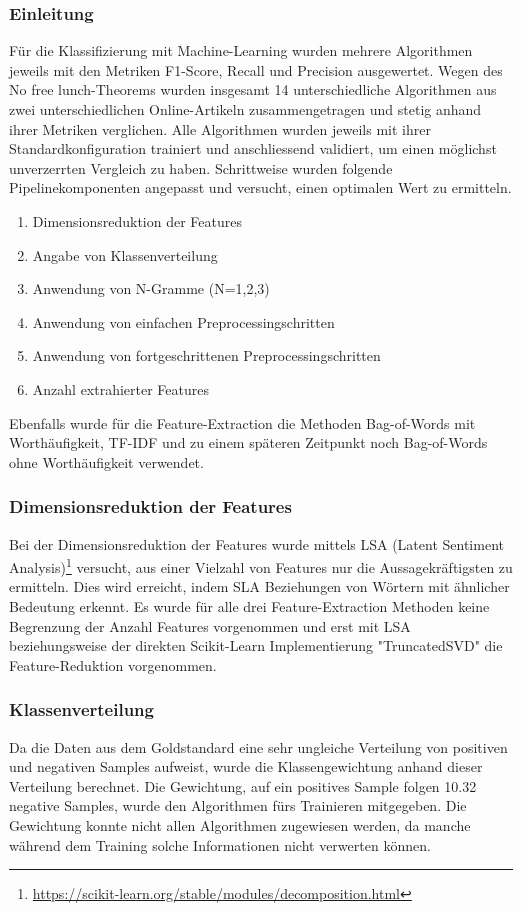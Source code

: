 \subsubsection{Einleitung}
Für die Klassifizierung mit Machine-Learning wurden mehrere Algorithmen jeweils mit den Metriken F1-Score, Recall und Precision ausgewertet.
Wegen des \glqq No free lunch\grqq{}-Theorems wurden insgesamt 14 unterschiedliche Algorithmen aus zwei unterschiedlichen Online-Artikeln zusammengetragen und stetig anhand ihrer Metriken verglichen.
Alle Algorithmen wurden jeweils mit ihrer Standardkonfiguration trainiert und anschliessend validiert, um einen möglichst unverzerrten Vergleich zu haben.
Schrittweise wurden folgende Pipelinekomponenten angepasst und versucht, einen optimalen Wert zu ermitteln.
\begin{enumerate}
	\item Dimensionsreduktion der Features 
	\item Angabe von Klassenverteilung
	\item Anwendung von N-Gramme (N={1,2,3})
	\item Anwendung von einfachen Preprocessingschritten
	\item Anwendung von fortgeschrittenen Preprocessingschritten
	\item Anzahl extrahierter Features
\end{enumerate}
Ebenfalls wurde für die Feature-Extraction die Methoden Bag-of-Words mit Worthäufigkeit, TF-IDF und zu einem späteren Zeitpunkt noch Bag-of-Words ohne Worthäufigkeit verwendet.
\subsubsection{Dimensionsreduktion der Features}
Bei der Dimensionsreduktion der Features wurde mittels LSA (Latent Sentiment Analysis)\footnote{\url{https://scikit-learn.org/stable/modules/decomposition.html}} versucht, aus einer Vielzahl von Features nur die Aussagekräftigsten zu ermitteln.
Dies wird erreicht, indem SLA Beziehungen von Wörtern mit ähnlicher Bedeutung erkennt.
Es wurde für alle drei Feature-Extraction Methoden keine Begrenzung der Anzahl Features vorgenommen und erst mit LSA beziehungsweise der direkten Scikit-Learn Implementierung "TruncatedSVD" die Feature-Reduktion vorgenommen.
\subsubsection{Klassenverteilung}
Da die Daten aus dem Goldstandard eine sehr ungleiche Verteilung von positiven und negativen Samples aufweist, wurde die Klassengewichtung anhand dieser Verteilung berechnet.
Die Gewichtung, auf ein positives Sample folgen 10.32 negative Samples, wurde den Algorithmen fürs Trainieren mitgegeben.
Die Gewichtung konnte nicht allen Algorithmen zugewiesen werden, da manche während dem Training solche Informationen nicht verwerten können.
